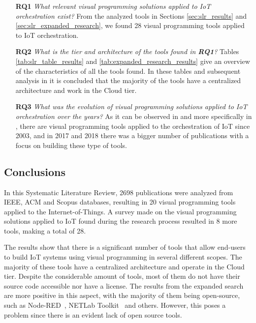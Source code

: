 \begin{itemize}

\item[\textbf{RQ1}] \textit{What relevant visual programming solutions applied to IoT orchestration exist?} From the analyzed tools in Sections \ref{sec:slr_results} and \ref{sec:slr_expanded_research}, we found 28 visual programming tools applied to IoT orchestration. 

\item[\textbf{RQ2}] \textit{What is the tier and architecture of the tools found in \textbf{RQ1}?} Tables \ref{tab:slr_table_results} and \ref{tab:expanded_research_results} give an overview of the characteristics of all the tools found. In these tables and subsequent analysis in  it is concluded that the majority of the tools have a centralized architecture and work in the Cloud tier.

\item[\textbf{RQ3}] \textit{What was the evolution of visual programming solutions applied to IoT orchestration over the years?} As it can be observed in  and more specifically in , there are visual programming tools applied to the orchestration of IoT since 2003, and in 2017 and 2018 there was a bigger number of publications with a focus on building these type of tools.  
\end{itemize}


\subsection{Conclusions}\label{sec:slr_conclusions}

In this Systematic Literature Review, 2698 publications were analyzed from IEEE, ACM and Scopus databases, resulting in 20 visual programming tools applied to the Internet-of-Things. A survey made on the visual programming solutions applied to IoT found during the research process resulted in 8 more tools, making a total of 28.

The results show that there is a significant number of tools that allow end-users to build IoT systems using visual programming in several different scopes. The majority of these tools have a centralized architecture and operate in the Cloud tier. Despite the considerable amount of tools, most of them do not have their source code accessible nor have a license. The results from the expanded search are more positive in this aspect, with the majority of them being open-source, such as Node-RED~\cite{node_red}, NETLab Toolkit~\cite{netlabtoolkit} and others. However, this poses a problem since there is an evident lack of open source tools.

